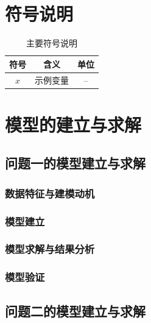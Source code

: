 \documentclass[withoutpreface]{cumcmthesis}
\begin{document}
\section{符号说明}
\begin{table}[!htbp]
\caption{主要符号说明}\label{tab:symbols}\centering
\begin{tabular}{ccc}
\toprule[1.5pt]
符号 & 含义 & 单位\\
\midrule[1pt]
$x$ & 示例变量 & --\\
\bottomrule[1.5pt]
\end{tabular}
\end{table}

\section{模型的建立与求解}

\subsection{问题一的模型建立与求解}
\subsubsection{数据特征与建模动机}
\subsubsection{模型建立}
\subsubsection{模型求解与结果分析}
\subsubsection{模型验证}

\subsection{问题二的模型建立与求解}

\end{document}
